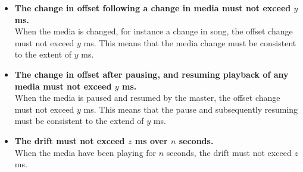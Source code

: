 \begin{eletterate}
\begin{itemize}
        \item \textbf{The change in offset following a change in media must not exceed $y$ ms.} \hfill\\
            When the media is changed, for instance a change in song, the offset change must not exceed $y$ ms.
            This means that the media change must be consistent to the extent of $y$ ms.

        \item \textbf{The change in offset after pausing, and resuming playback of any media must not exceed $y$ ms.} \hfill\\
            When the media is paused and resumed by the master, the offset change must not exceed $y$ ms.
            This means that the pause and subsequently resuming must be consistent to the extend of $y$ ms.

        \item \textbf{The drift must not exceed $z$ ms over $n$ seconds.} \hfill\\
            When the media have been playing for $n$ seconds, the drift must not exceed $z$ ms.
    \end{itemize}
\end{eletterate}

